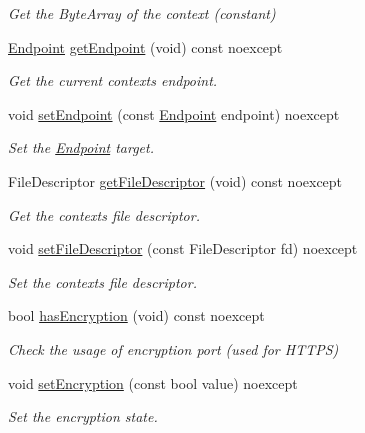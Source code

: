 \begin{DoxyCompactItemize}
\begin{DoxyCompactList}\small\item\em Get the Byte\+Array of the context (constant) \end{DoxyCompactList}\item 
\mbox{\hyperlink{classo_z_1_1_endpoint}{Endpoint}} \mbox{\hyperlink{classo_z_1_1_packet_a89367cc491fdfdb6bf88eda9bc4eb219}{get\+Endpoint}} (void) const noexcept
\begin{DoxyCompactList}\small\item\em Get the current context\textquotesingle{}s endpoint. \end{DoxyCompactList}\item 
void \mbox{\hyperlink{classo_z_1_1_packet_a2bcd9f2d612cbc1b59a8b7c99d706908}{set\+Endpoint}} (const \mbox{\hyperlink{classo_z_1_1_endpoint}{Endpoint}} endpoint) noexcept
\begin{DoxyCompactList}\small\item\em Set the \mbox{\hyperlink{classo_z_1_1_endpoint}{Endpoint}} target. \end{DoxyCompactList}\item 
File\+Descriptor \mbox{\hyperlink{classo_z_1_1_packet_a65cfd7021de4eaf78f716143b82cd4a1}{get\+File\+Descriptor}} (void) const noexcept
\begin{DoxyCompactList}\small\item\em Get the context\textquotesingle{}s file descriptor. \end{DoxyCompactList}\item 
void \mbox{\hyperlink{classo_z_1_1_packet_abf619a065ca7321c05fdcacc6353d47d}{set\+File\+Descriptor}} (const File\+Descriptor fd) noexcept
\begin{DoxyCompactList}\small\item\em Set the context\textquotesingle{}s file descriptor. \end{DoxyCompactList}\item 
bool \mbox{\hyperlink{classo_z_1_1_packet_abf9bd4979afb439272832d5a90f7d556}{has\+Encryption}} (void) const noexcept
\begin{DoxyCompactList}\small\item\em Check the usage of encryption port (used for H\+T\+T\+PS) \end{DoxyCompactList}\item 
void \mbox{\hyperlink{classo_z_1_1_packet_a7c6fc3f9ca25adf83be8e7c1f5ae5b70}{set\+Encryption}} (const bool value) noexcept
\begin{DoxyCompactList}\small\item\em Set the encryption state. \end{DoxyCompactList}\end{DoxyCompactItemize}


